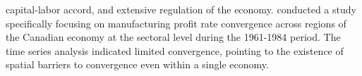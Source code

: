 \documentclass[10pt]{article}
\begin{document}
capital-labor accord, and extensive regulation of the economy. \citet{rigby1991technical} conducted a study specifically focusing on manufacturing profit rate convergence across regions of the Canadian economy at the sectoral level during the 1961-1984 period. The time series analysis indicated limited convergence, pointing to the existence of spatial barriers to convergence even within a single economy.






\end{document}
